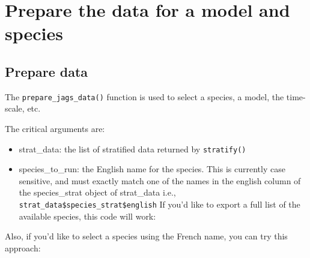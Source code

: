 \documentclass[
]{book}
\newenvironment{Shaded}{\begin{snugshade}}{\end{snugshade}}
\newcommand{\CommentTok}[1]{\textcolor[rgb]{0.56,0.35,0.01}{\textit{#1}}}
\newcommand{\FunctionTok}[1]{\textcolor[rgb]{0.00,0.00,0.00}{#1}}
\newcommand{\NormalTok}[1]{#1}
\newcommand{\OtherTok}[1]{\textcolor[rgb]{0.56,0.35,0.01}{#1}}
\newcommand{\SpecialCharTok}[1]{\textcolor[rgb]{0.00,0.00,0.00}{#1}}
\newcommand{\StringTok}[1]{\textcolor[rgb]{0.31,0.60,0.02}{#1}}
\providecommand{\tightlist}{%
  \setlength{\itemsep}{0pt}\setlength{\parskip}{0pt}}
\begin{document}
\hypertarget{DataPrep}{%
\chapter{Prepare the data for a model and species}\label{DataPrep}}

\hypertarget{prepare-data}{%
\section{Prepare data}\label{prepare-data}}

The \texttt{prepare\_jags\_data()} function is used to select a species, a model, the time-scale, etc.

The critical arguments are:

\begin{itemize}
\tightlist
\item
  strat\_data: the list of stratified data returned by \texttt{stratify()}
\item
  species\_to\_run: the English name for the species. This is currently case sensitive, and must exactly match one of the names in the english column of the species\_strat object of strat\_data i.e., \texttt{strat\_data\$species\_strat\$english}
  If you'd like to export a full list of the available species, this code will work:
\end{itemize}

\begin{Shaded}
\end{Shaded}

Also, if you'd like to select a species using the French name, you can try this approach:

\begin{Shaded}
\end{Shaded}
\end{document}
